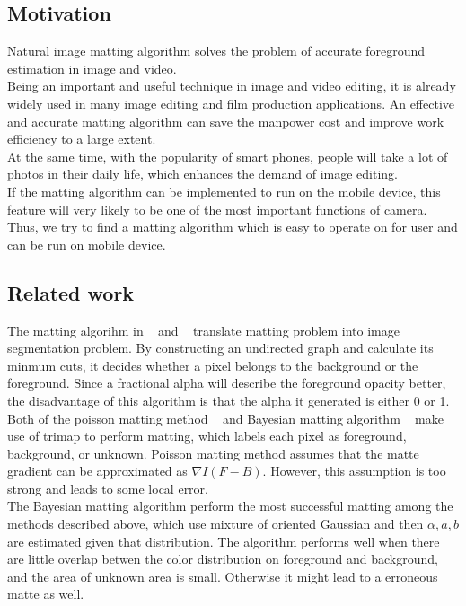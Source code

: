 \documentclass[11pt,letterpaper]{article}
\begin{document}
\subsection{Motivation}
Natural image matting algorithm solves the problem of accurate foreground estimation in image and video. \\

Being an important and useful technique in image and video editing, it is already widely used in many image editing and film production applications. An effective and accurate matting algorithm can save the manpower cost and improve work efficiency to a large extent. \\

At the same time, with the popularity of smart phones, people will take a lot of photos in their daily life, which enhances the demand of image editing. \\

If the matting algorithm can be implemented to run on the mobile device, this feature will very likely to be one of the most important functions of camera.\\ 

Thus, we try to find a matting algorithm which is easy to operate on for user and can be run on mobile device.\\

\subsection{Related work}
The matting algorihm in ~\cite{Boykov:2001} and ~\cite{Li:2004} translate matting problem into image segmentation problem. By constructing an undirected graph and calculate its minmum cuts, it decides whether a pixel belongs to the background or the foreground. Since a fractional alpha will describe the foreground opacity better, the disadvantage of this algorithm is that the alpha it generated is either 0 or 1. \\

Both of the poisson matting method ~\cite{Sun:2004} and Bayesian matting algorithm ~\cite{Chuang:2001} make use of trimap to perform matting, which labels each pixel as foreground, background, or unknown. Poisson matting method assumes that the matte gradient can be approximated as $\nabla I (F - B)$. However, this assumption is too strong and leads to some local error. \\

The Bayesian matting algorithm perform the most successful matting among the methods described above, which use mixture of oriented Gaussian and then $\alpha, a, b$ are estimated given that distribution. The algorithm performs well when there are little overlap betwen the color distribution on foreground and background, and the area of unknown area is small. Otherwise it might lead to a erroneous matte as well.\\
\end{document}
